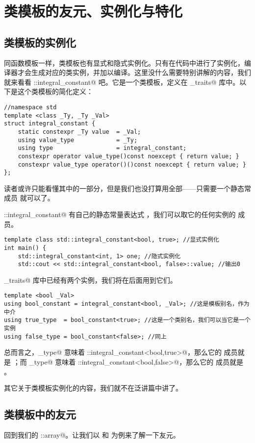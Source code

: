 \section{类模板的友元、实例化与特化}
\subsection*{类模板的实例化}
同函数模板一样，类模板也有显式和隐式实例化。只有在代码中进行了实例化，编译器才会生成对应的类实例，并加以编译。这里没什么需要特别讲解的内容，我们就来看看 \lstinline@std::integral_constant@ 吧。它是一个类模板，定义在 \lstinline@type_traits@ 库中。以下是这个类模板的简化定义：
\begin{lstlisting}
//namespace std
template <class _Ty, _Ty _Val>
struct integral_constant {
    static constexpr _Ty value  = _Val;
    using value_type            = _Ty;
    using type                  = integral_constant;
    constexpr operator value_type()const noexcept { return value; }
    constexpr value_type operator()()const noexcept { return value; }
};
\end{lstlisting}
读者或许只能看懂其中的一部分，但是我们也没打算用全部——只需要一个静态常成员 \lstinline@value@ 就可以了。\par
\lstinline@std::integral_constant@ 有自己的静态常量表达式 \lstinline@value@，我们可以取它的任何实例的 \lstinline@value@ 成员。
\begin{lstlisting}
template class std::integral_constant<bool, true>; //显式实例化
int main() {
    std::integral_constant<int, 1> one; //隐式实例化
    std::cout << std::integral_constant<bool, false>::value; //输出0
\end{lstlisting}
\lstinline@type_traits@ 库中已经有两个实例，我们将在后面用到它们。
\begin{lstlisting}
template <bool _Val>
using bool_constant = integral_constant<bool, _Val>; //这是模板别名，作为中介
using true_type  = bool_constant<true>; //这是一个类别名，我们可以当它是一个实例
using false_type = bool_constant<false>; //同上
\end{lstlisting}
总而言之，\lstinline@true_type@ 意味着 \lstinline@std::integral_constant<bool,true>@，那么它的 \lstinline@value@ 成员就是 \lstinline@true@；而 \lstinline@false_type@ 意味着 \lstinline@std::integral_constant<bool,false>@，那么它的 \lstinline@value@ 成员就是 \lstinline@false@。\par
其它关于类模板实例化的内容，我们就不在泛讲篇中讲了。\par
\subsection*{类模板中的友元}
回到我们的 \lstinline@user::array@。让我们以 \lstinline@get@ 和 \lstinline@swap@ 为例来了解一下友元。\par
